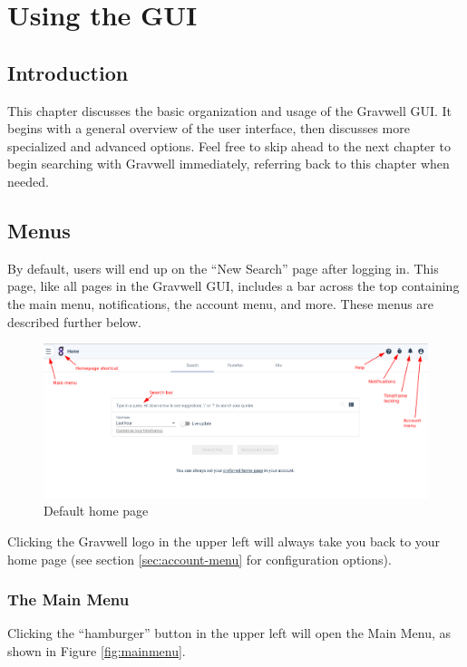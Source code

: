 \chapter{Using the GUI}

\section{Introduction}

This chapter discusses the basic organization and usage of the Gravwell GUI. It begins with a general overview of the user interface, then discusses more specialized and advanced options. Feel free to skip ahead to the next chapter to begin searching with Gravwell immediately, referring back to this chapter when needed.

\section{Menus}
By default, users will end up on the ``New Search'' page after logging in. This page, like all pages in the Gravwell GUI, includes a bar across the top containing the main menu, notifications, the account menu, and more. These menus are described further below.

\begin{figure}
	\includegraphics{images/homepage.png}
	\caption{Default home page}
	\label{fig:newsearch}
\end{figure}

Clicking the Gravwell logo in the upper left will always take you back to your home page (see section \ref{sec:account-menu} for configuration options).

\subsection{The Main Menu}

Clicking the ``hamburger'' button in the upper left will open the Main Menu, as shown in Figure \ref{fig:mainmenu}.

